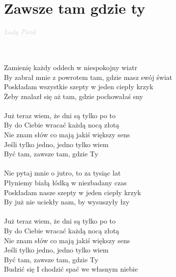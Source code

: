 \documentclass[a5paper, 10pt]{book}
\begin{document}
\section{Zawsze tam gdzie ty}\textcolor{lightgray}{\textit{Lady Pank}}\\~\\
\begin{minipage}[t]{0.7\textwidth}
~\\
Zamienię każdy oddech w niespokojny wiatr\\
By zabrał mnie z powrotem tam, gdzie masz swój świat\\
Poskładam wszystkie szepty w jeden ciepły krzyk\\
Żeby znalazł się aż tam, gdzie pochowałaś sny\\
\\
\hspace*{4mm}Już teraz wiem, że dni są tylko po to\\
\hspace*{4mm}By do Ciebie wracać każdą nocą złotą\\
\hspace*{4mm}Nie znam słów co mają jakiś większy sens\\
\hspace*{4mm}Jeśli tylko jedno, jedno tylko wiem\\
\hspace*{4mm}Być tam, zawsze tam, gdzie Ty\\
\\
Nie pytaj mnie o jutro, to za tysiąc lat\\
Płyniemy białą łódką w niezbadany czas\\
Poskładam nasze szepty w jeden ciepły krzyk\\
By już nie uciekły nam, by wysuszyły łzy\\
\\
\hspace*{4mm}Już teraz wiem, że dni są tylko po to\\
\hspace*{4mm}By do Ciebie wracać każdą nocą złotą\\
\hspace*{4mm}Nie znam słów co mają jakiś większy sens\\
\hspace*{4mm}Jeśli tylko jedno, jedno tylko wiem\\
\hspace*{4mm}Być tam, zawsze tam, gdzie Ty\\
\hspace*{4mm}Budzić się I chodzić spać we własnym niebie\\

\end{minipage}
\end{document}
